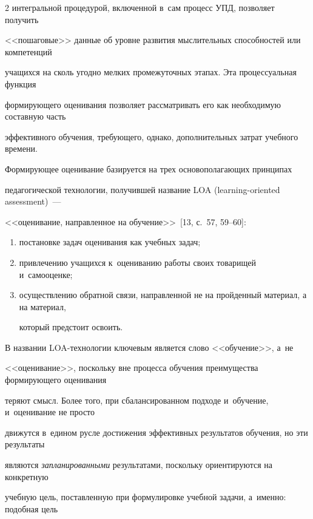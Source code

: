 \begin{multicols}{2}
интегральной процедурой, включенной в~сам процесс УПД, позволяет получить


<<пошаговые>> данные об уровне развития мыслительных способностей или компетенций


учащихся на сколь угодно мелких промежуточных этапах. Эта процессуальная функция


формирующего оценивания позволяет рассматривать его как необходимую составную часть


эффективного обучения, требующего, однако, дополнительных затрат учебного времени.





  Формирующее оценивание базируется на трех основополагающих принципах


педагогической технологии, получившей название LOA (learning-oriented assessment)~---


<<оценивание, направленное на обучение>>~[13, с.~57, 59--60]:


  \begin{enumerate}[(1)]


\item постановке задач оценивания как учебных задач;


\item привлечению учащихся к~оцениванию работы своих товарищей и~самооценке;


\item осуществлению обратной связи, направленной не на пройденный материал, а на материал,


который предстоит освоить.


\end{enumerate}





  В названии LOA-технологии ключевым является слово <<обучение>>, а~не


<<оценивание>>, поскольку вне процесса обучения преимущества фор\-ми\-ру\-юще\-го оценивания


теряют смысл. Более того, при сбалансированном подходе и~обучение, и~оценивание не просто


движутся в~едином русле достижения эффективных результатов обучения, но эти результаты


являются \textit{запланированными} результатами, поскольку ориентируются на конкретную


учебную цель, поставленную при формулировке учебной задачи, а~именно: подобная цель



\end{multicols}

